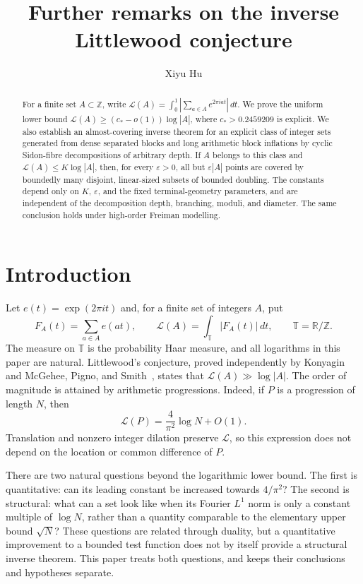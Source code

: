 \documentclass[11pt,reqno]{amsart}
\title[Further remarks on the inverse Littlewood conjecture]{Further remarks on the inverse Littlewood conjecture}
\author{Xiyu Hu}
\date{}
\numberwithin{equation}{section}
\theoremstyle{definition}
\theoremstyle{remark}
\newcommand{\Z}{\mathbb Z}
\newcommand{\R}{\mathbb R}
\newcommand{\T}{\mathbb T}
\newcommand{\La}{\mathcal L}
\newcommand{\eps}{\varepsilon}
\begin{document}
\begin{abstract}
For a finite set $A\subset\Z$, write
$\La(A)=\int_0^1|\sum_{a\in A}e^{2\pi iat}|\,dt$.
We prove the uniform lower bound
$\La(A)\ge(c_*-o(1))\log|A|$, where $c_*>0.2459209$ is explicit.
We also establish an almost-covering inverse theorem for an explicit class
of integer sets generated from dense separated blocks and long arithmetic
block inflations by cyclic Sidon-fibre decompositions of arbitrary depth.
If $A$ belongs to this class and $\La(A)\le K\log|A|$, then, for every
$\eps>0$, all but $\eps|A|$ points are covered by boundedly many disjoint,
linear-sized subsets of bounded doubling. The constants depend only on
$K$, $\eps$, and the fixed terminal-geometry parameters, and are independent
of the decomposition depth, branching, moduli, and diameter.
The same conclusion holds under high-order Freiman modelling.
\end{abstract}
\maketitle
\tableofcontents

\section{Introduction}
\label{sec:introduction}

Let $e(t)=\exp(2\pi it)$ and, for a finite set of integers $A$, put
\begin{equation}\label{eq:norm-definition}
 F_A(t)=\sum_{a\in A}e(at),\qquad
 \La(A)=\int_{\T}|F_A(t)|\,dt,\qquad \T=\R/\Z.
\end{equation}
The measure on $\T$ is the probability Haar measure, and all logarithms in
this paper are natural. Littlewood's conjecture, proved independently by
Konyagin~\cite{Konyagin} and McGehee, Pigno, and Smith~\cite{MPS}, states that
$\La(A)\gg\log|A|$. The order of magnitude is attained by arithmetic
progressions. Indeed, if $P$ is a progression of length $N$, then
\begin{equation}\label{eq:ap-asymptotic}
 \La(P)=\frac4{\pi^2}\log N+O(1).
\end{equation}
Translation and nonzero integer dilation preserve $\La$, so this expression
does not depend on the location or common difference of $P$.

There are two natural questions beyond the logarithmic lower bound. The
first is quantitative: can its leading constant be increased towards
$4/\pi^2$? The second is structural: what can a set look like when its
Fourier $L^1$ norm is only a constant multiple of $\log N$, rather than a
quantity comparable to the elementary upper bound $\sqrt N$? These
questions are related through duality, but a quantitative improvement to
a bounded test function does not by itself provide a structural inverse
theorem. This paper treats both questions, and keeps their conclusions
and hypotheses separate.
\end{document}
